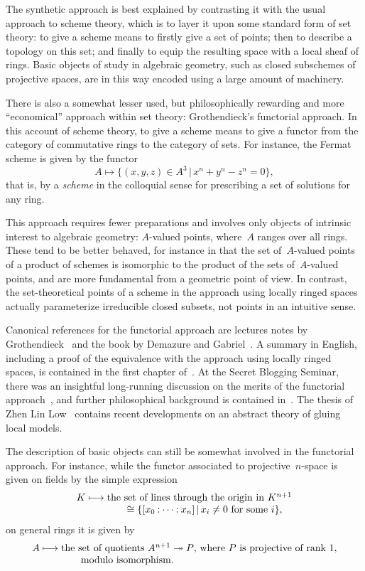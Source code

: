 \documentclass[10pt,reqno,a4paper]{amsbook}
\theoremstyle{definition}
\theoremstyle{plain}
\theoremstyle{remark}
\newcommand{\?}{\,{:}\,}
\newcommand{\hg}{\mathbin{:}}  %
\renewcommand{\_}{\mathpunct{.}\,}
\begin{document}
{The synthetic approach is best explained by contrasting it with the usual
approach to scheme theory, which is to layer it upon some standard form of set theory:
to give a scheme means to firstly give a set of points; then
to describe a topology on this set; and finally to equip the resulting space
with a local sheaf of rings. Basic objects of study in algebraic geometry, such
as closed subschemes of projective spaces, are in this way encoded using a large
amount of machinery.

There is also a somewhat lesser used, but philosophically rewarding and more
``economical'' approach within set theory: Grothendieck's functorial approach.
In this account of scheme theory, to give a scheme means to give a functor
from the category of commutative rings to the category of sets. For instance,
the Fermat scheme is given by the functor
\[ A \longmapsto \{ (x,y,z) \in A^3 \,|\, x^n + y^n - z^n = 0 \}, \]
that is, by a \emph{scheme} in the colloquial sense for prescribing a set of
solutions for any ring.

This approach requires fewer preparations and involves
only objects of intrinsic interest to algebraic geometry: $A$-valued points,
where~$A$ ranges over all rings. These tend to be better behaved, for instance in
that the set of~$A$-valued points of a product of schemes is isomorphic to the
product of the sets of~$A$-valued points, and are more fundamental from a
geometric point of view. In contrast, the set-theoretical points of a scheme in
the approach using locally ringed spaces actually parameterize irreducible
closed subsets, not points in an intuitive sense.

Canonical references for the functorial approach are lectures notes by
Gro\-then\-dieck~\cite{grothendieck:functorial-ag} and the book by Demazure and
Gabriel~\cite{demazure:gabriel}. A summary in English, including a proof of the
equivalence with the approach using locally ringed spaces, is contained in the
first chapter of~\cite{vezzani:fun}. At the Secret Blogging Seminar, there was
an insightful long-running discussion on the merits of the functorial
approach~\cite{secret-blogging-seminar:fpov}, and further philosophical background
is contained in~\cite{mclarty:ontology}. The thesis of Zhen Lin Low~\cite{low:local-models}
contains recent developments on an abstract theory of gluing local models.

The description of basic objects can still be somewhat involved in the
functorial approach. For instance, while the functor associated to
projective~$n$-space is given on fields by the simple expression
\[ \begin{array}{r@{}c@{}l}
  K &{}\longmapsto{}& \text{the set of lines through the origin in~$K^{n+1}$} \\
  && \qquad \cong \{ [x_0 \hg \cdots \hg x_n] \,|\, \text{$x_i \neq 0$ for some~$i$} \},
\end{array} \]
on general rings it is given by
\[ \begin{array}{r@{}c@{}l}
  A &{}\longmapsto{}& \text{the set of quotients~$A^{n+1} \twoheadrightarrow P$,
  where~$P$ is projective of rank~1,} \\
  && \qquad \text{modulo isomorphism}.
\end{array} \]

}
\end{document}
